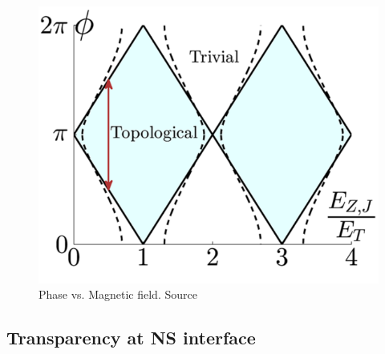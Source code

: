 	\begin{figure}[!htb]
	\centering
	\includegraphics[width=0.5\columnwidth]{figures/pientka_phase_diagram}
	\caption{Phase vs. Magnetic field. Source\cite{pientka_topological_2017}}
	\label{fig:pientka_phase_diagram}
	\end{figure}
		
	\subsection{Transparency at NS interface}

